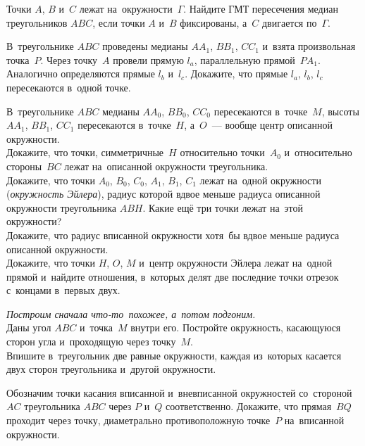 \begin{problems}

\item
Точки $A$, $B$ и~$C$ лежат на~окружности~$\Gamma$.
Найдите ГМТ пересечения медиан треугольников $ABC$, если точки $A$ и~$B$
фиксированы, а~$C$ двигается по~$\Gamma$.

\item
В~треугольнике $ABC$ проведены медианы $A A_1$, $B B_1$, $C C_1$ и~взята
произвольная точка~$P$.
Через точку~$A$ провели прямую $l_a$, параллельную прямой~$P A_1$.
Аналогично определяются прямые $l_b$ и~$l_c$.
Докажите, что прямые $l_a$, $l_b$, $l_c$ пересекаются в~одной точке.

\item
В~треугольнике $ABC$ медианы $A A_0$, $B B_0$, $C C_0$ пересекаются
в~точке~$M$, высоты $A A_1$, $B B_1$, $C C_1$ пересекаются в~точке~$H$,
а~$O$~--- вообще центр описанной окружности.
\\
\sp
Докажите, что точки, симметричные~$H$ относительно точки~$A_0$ и~относительно
стороны~$BC$ лежат на~описанной окружности треугольника.
\\
\sp
Докажите, что точки $A_0$, $B_0$, $C_0$, $A_1$, $B_1$, $C_1$ лежат на~одной
окружности (\emph{окружность Эйлера}), радиус которой вдвое меньше радиуса
описанной окружности треугольника $ABH$.
Какие ещё три точки лежат на~этой окружности?
\\
\sp
Докажите, что радиус вписанной окружности хотя~бы вдвое меньше радиуса
описанной окружности.
\\
\sp
Докажите, что точки $H$, $O$, $M$ и~центр окружности Эйлера лежат на~одной
прямой и~найдите отношения, в~которых делят две последние точки отрезок
с~концами в~первых двух.

\item
\emph{Построим сначала что-то~похожее, а~потом подгоним.}
\\
\sp
Даны угол $ABC$ и~точка~$M$ внутри его.
Постройте окружность, касающуюся сторон угла и~проходящую через точку~$M$.
\\
\sp
Впишите в~треугольник две равные окружности, каждая из~которых касается двух
сторон треугольника и~другой окружности.

\item
Обозначим точки касания вписанной и~вневписанной окружностей со~стороной~$AC$
треугольника $ABC$ через $P$ и~$Q$ соответственно.
Докажите, что прямая~$BQ$ проходит через точку, диаметрально противоположную
точке~$P$ на~вписанной окружности.


\end{problems}
